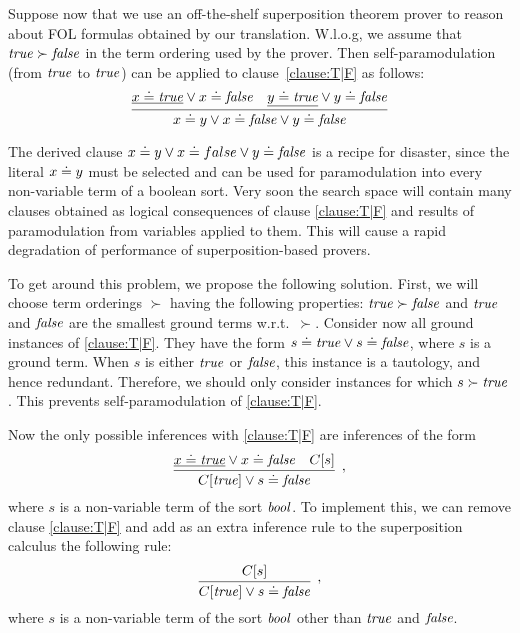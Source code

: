Suppose now that we use an off-the-shelf superposition theorem prover to reason about FOL formulas obtained by our translation. W.l.o.g, we assume that $\mathit{true} \succ \mathit{false}$ in the term ordering used by the prover. Then self-paramodulation (from $\mathit{true}$ to $\mathit{true}$) can be applied to clause~\eqref{clause:T|F} as follows:
\[
\infer{x \eql y \vee x \eql \false \vee y \eql \false}%
{\underline{x \eql \true} \vee x \eql \false & \underline{y \eql \true} \vee y \eql \false}
\]

The derived clause $x \doteq y \vee x \doteq false \vee y \doteq \mathit{false}$ is a recipe for disaster, since the literal $x \doteq y$ must be selected and can be used for paramodulation into every non-variable term of a boolean sort. Very soon the search space will contain many clauses obtained as logical consequences of clause \eqref{clause:T|F} and results of paramodulation from variables applied to them. This will cause a rapid degradation of performance of superposition-based provers.

To get around this problem, we propose the following solution. First, we will choose term
orderings $\succ$ having the following properties: $\mathit{true}\succ\mathit{false}$ and $\mathit{true}$ and
$\mathit{false}$ are the smallest ground terms w.r.t.\ $\succ$. Consider now all ground instances of \eqref{clause:T|F}. They have the form $s \doteq \mathit{true} \vee s \doteq \mathit{false}$, where $s$ is a ground term. When $s$ is either $\mathit{true}$ or $\mathit{false}$, this instance is a tautology, and hence redundant. Therefore, we should only consider instances for which $s \succ \mathit{true}$. This prevents self-paramodulation of \eqref{clause:T|F}.

Now the only possible inferences with \eqref{clause:T|F} are inferences of the form
\[
\infer[,]{C[\true] \vee s \eql \false}%
{\underline{x \eql \true} \vee x \eql \false & C[s]}
\]
where $s$ is a non-variable term of the sort $\mathit{bool}$.
To implement this, we can remove clause \eqref{clause:T|F} and add as an extra inference rule to the superposition calculus the following rule:
\[
\infer[,]{C[\true] \vee s \eql \false}%
{C[s]}
\]
where $s$ is a non-variable term of the sort $\mathit{bool}$ other than $\mathit{true}$ and $\mathit{false}$.
